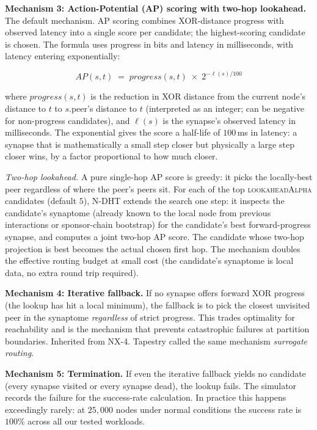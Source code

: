 \documentclass[twoside,nobib]{tufte-book}
\newcommand{\NDHT}{N-DHT\xspace}
\begin{document}
\textbf{Mechanism 3: Action-Potential (AP) scoring with two-hop
lookahead.} The default mechanism. AP scoring combines
XOR-distance progress with observed latency into a single score
per candidate; the highest-scoring candidate is chosen. The
formula uses progress in bits and latency in milliseconds, with
latency entering exponentially:

\begin{equation}
  \mathit{AP}(s, t) \;=\; \mathit{progress}(s, t) \;\times\;
  2^{-\ell(s) / 100}
  \label{eq:ap}
\end{equation}

where $\mathit{progress}(s, t)$ is the reduction in XOR distance
from the current node's distance to $t$ to $s$.peer's distance to
$t$ (interpreted as an integer; can be negative for non-progress
candidates), and $\ell(s)$ is the synapse's observed latency in
milliseconds. The exponential gives the score a half-life of
$100$\,ms in latency: a synapse that is mathematically a small
step closer but physically a large step closer wins, by a factor
proportional to how much closer.

\emph{Two-hop lookahead.} A pure single-hop AP score is greedy:
it picks the locally-best peer regardless of where the peer's
peers sit. For each of the top \textsc{lookaheadAlpha} candidates
(default $5$), \NDHT extends the search one step: it inspects the
candidate's synaptome (already known to the local node from
previous interactions or sponsor-chain bootstrap) for the
candidate's best forward-progress synapse, and computes a joint
two-hop AP score. The candidate whose two-hop projection is best
becomes the actual chosen first hop. The mechanism doubles the
effective routing budget at small cost (the candidate's synaptome
is local data, no extra round trip required).

\textbf{Mechanism 4: Iterative fallback.} If no synapse offers
forward XOR progress (the lookup has hit a local minimum), the
fallback is to pick the closest unvisited peer in the synaptome
\emph{regardless} of strict progress. This trades optimality for
reachability and is the mechanism that prevents catastrophic
failures at partition boundaries. Inherited from NX-4. Tapestry
called the same mechanism \emph{surrogate routing}.

\textbf{Mechanism 5: Termination.} If even the iterative fallback
yields no candidate (every synapse visited or every synapse
dead), the lookup fails. The simulator records the failure for
the success-rate calculation. In practice this happens
exceedingly rarely: at $25{,}000$ nodes under normal conditions
the success rate is $100\%$ across all our tested workloads.
\end{document}
